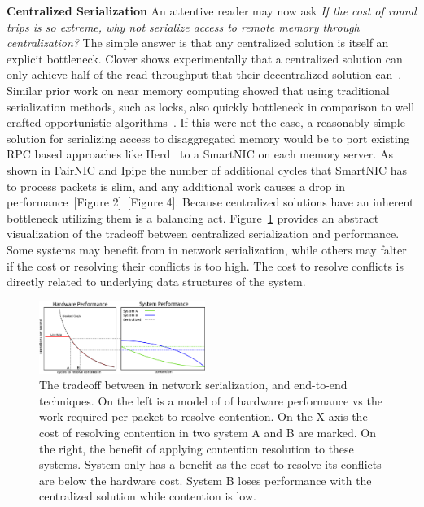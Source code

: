 \textbf{Centralized Serialization} 
An attentive reader may now ask \textit{If the cost of round trips is so
extreme, why not serialize access to remote memory through centralization?} The
simple answer is that any centralized solution is itself an explicit bottleneck.
Clover shows experimentally that a centralized solution can only achieve half of
the read throughput that their decentralized solution can~\cite{clover}. Similar
prior work on near memory computing showed that using traditional serialization
methods, such as locks, also quickly bottleneck in comparison to well crafted
opportunistic algorithms~\cite{near-memory-structs}.  If this were not the case,
a reasonably simple solution for serializing access to disaggregated memory
would be to port existing RPC based approaches like Herd~\cite{herd} to a
SmartNIC on each memory server. As shown in FairNIC and Ipipe the number of
additional cycles that SmartNIC has to process packets is slim, and any
additional work causes a drop in performance~\cite{fairnic}[Figure
2]~\cite{ipipe}[Figure 4]. Because centralized solutions have an inherent
bottleneck utilizing them is a balancing act. Figure~\ref{fig:middlebox_model}
provides an abstract visualization of the tradeoff between centralized
serialization and performance. Some systems may benefit from in network
serialization, while others may falter if the cost or resolving their conflicts
is too high. The cost to resolve conflicts is directly related to underlying
data structures of the system.

\begin{figure}
    \includegraphics[width=0.48\textwidth]{fig/in_network_tradeoff.pdf}

    \caption{The tradeoff between in network serialization, and end-to-end
    techniques. On the left is a model of of hardware performance vs the work
    required per packet to resolve contention. On the X axis the cost of
    resolving contention in two system A and B are marked. On the right, the
    benefit of applying contention resolution to these systems. System only has
    a benefit as the cost to resolve its conflicts are below the hardware cost.
    System B loses performance with the centralized solution while contention is
    low.}

    \label{fig:middlebox_model}
\end{figure}

